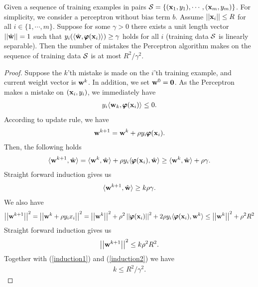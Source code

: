 {\iffalse
\begin{theory}\label{perceptron_theory}
	Given a sequence of training examples in pairs $\mathcal{S}=\{(\mathbf {x}_1,y_1),\cdots,(\mathbf {x}_m,y_m)\}$. 
	For simplicity, we consider a perceptron without bias term $b$.
	Assume $\left|\left| \mathbf {x}_i \right|\right|\le R$ for all $i\in\{1,\cdots,m\}$.
	Suppose for some $\gamma>0$ there exists a unit length vector $\left|\left| \hat{\mathbf {w}} \right|\right|=1$ such that $y_i(\langle \hat{\mathbf {w}}, \pmb \varphi(\mathbf {x}_i) \rangle)\ge\gamma$ holds for all $i$ (training data $\mathcal{S}$ is linearly separable).
	Then the number of mistakes the Perceptron algorithm makes on the sequence of training data $\mathcal{S}$ is at most ${R^2}/{\gamma^2}$.
\end{theory}
\begin{proof}
	Suppose the $k$'th mistake is made on the $i$'th training example, and current weight vector is $\mathbf {w}^k$.
	In addition, we set $\mathbf {w}^0=\mathbf {0}$.
	As the Perceptron makes a mistake on $(\mathbf {x}_i,y_i)$, we immediately have
	\begin{align*}
		y_i\langle \mathbf {w}_k, \pmb \varphi(\mathbf {x}_i) \rangle \le 0.
	\end{align*}
	According to update rule, we have
	\begin{align*}
		\mathbf {w}^{k+1} = \mathbf {w}^{k} + \rho y_i\pmb \varphi(\mathbf {x}_i).
	\end{align*}
	Then, the following holds
	\begin{align*}
		\langle \mathbf {w}^{k+1}, \hat{\mathbf {w}} \rangle = \langle \mathbf {w}^k, \hat{\mathbf {w}} \rangle + \rho y_i\langle \pmb \varphi(\mathbf {x}_i), \hat{\mathbf {w}} \rangle \ge \langle \mathbf {w}^k, \hat{\mathbf {w}} \rangle + \rho\gamma.
	\end{align*}
	Straight forward induction gives us
	\begin{align}
		\langle \mathbf {w}^{k+1}, \hat{\mathbf {w}} \rangle\ge k\rho\gamma. \label{induction1}
	\end{align}
	We also have
	\begin{align*}
		\left|\left| \mathbf {w}^{k+1} \right|\right|^2 
		= \left|\left| \mathbf {w}^{k} + \rho y_ix_i \right|\right|^2
		= \left|\left| \mathbf {w}^k \right|\right|^2 + \rho^2\left|\left| \pmb \varphi(\mathbf {x}_i) \right|\right|^2 + 2\rho y_i\langle \pmb \varphi(\mathbf {x}_i), \mathbf {w}^k \rangle
		\le \left|\left| \mathbf {w}^k \right|\right|^2 + \rho^2R^2
	\end{align*}
	Straight forward induction gives us
	\begin{align}
		\left|\left| \mathbf {w}^{k+1} \right|\right|^2\le k\rho^2R^2. \label{induction2}
	\end{align}
	Together with (\ref{induction1}) and (\ref{induction2}) we have
	\begin{align*}
		k\le{R^2}/{\gamma^2}.
	\end{align*}
\end{proof}

}
